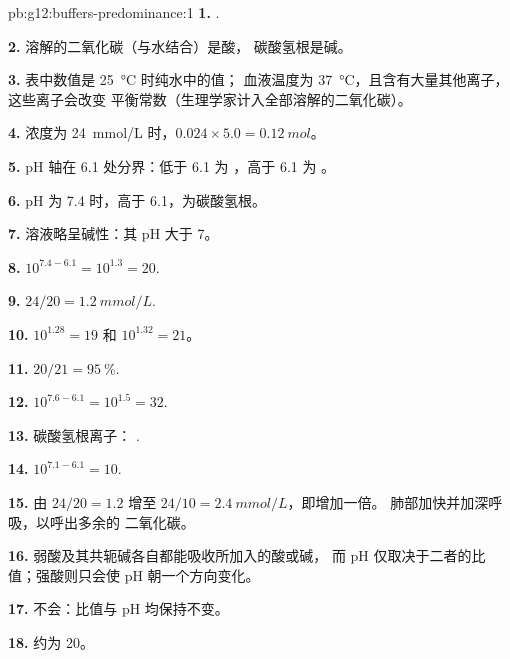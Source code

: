 \begin{solution}{pb:g12:buffers-predominance:1}
\textbf{1.} .

\textbf{2.} 溶解的二氧化碳（与水结合）是酸，
碳酸氢根是碱。

\textbf{3.} 表中数值是 \qty{25}{\celsius} 时纯水中的值；
血液温度为 \qty{37}{\celsius}，且含有大量其他离子，这些离子会改变
平衡常数（生理学家计入全部溶解的二氧化碳）。

\textbf{4.} 浓度为 \qty{24}{mmol/L} 时，$0.024 \times 5.0 = \qty{0.12}{mol}$。

\textbf{5.} pH 轴在 6.1 处分界：低于 6.1 为 ，高于 6.1 为 。

\textbf{6.} pH 为 7.4 时，高于 6.1，为碳酸氢根。

\textbf{7.} 溶液略呈碱性：其 pH 大于 7。

\textbf{8.} $10^{7.4 - 6.1} = 10^{1.3} = 20$.

\textbf{9.} $24 / 20 = \qty{1.2}{mmol/L}$.

\textbf{10.} $10^{1.28} = 19$ 和 $10^{1.32} = 21$。

\textbf{11.} $20/21 = \qty{95}{\percent}$.

\textbf{12.} $10^{7.6 - 6.1} = 10^{1.5} = 32$.

\textbf{13.} 碳酸氢根离子：
.

\textbf{14.} $10^{7.1 - 6.1} = 10$.

\textbf{15.} 由 $24/20 = 1.2$ 增至 $24/10 = \qty{2.4}{mmol/L}$，即增加一倍。
肺部加快并加深呼吸，以呼出多余的
二氧化碳。

\textbf{16.} 弱酸及其共轭碱各自都能吸收所加入的酸或碱，
而 pH 仅取决于二者的比值；强酸则只会使
pH 朝一个方向变化。

\textbf{17.} 不会：比值与 pH 均保持不变。

\textbf{18.} 约为 20。
\end{solution}
